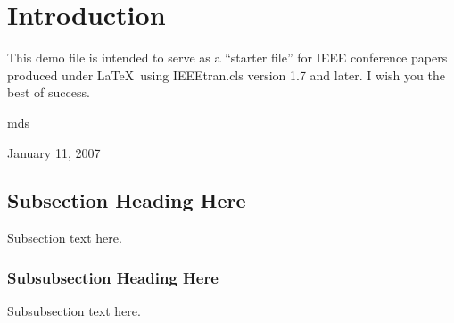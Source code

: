 \documentclass[10pt,conference]{IEEEtran}
\begin{document}




\maketitle


\begin{abstract}
The abstract goes here.
\end{abstract}





%
\IEEEpeerreviewmaketitle



\section{Introduction}
This demo file is intended to serve as a ``starter file''
for IEEE conference papers produced under \LaTeX\ using
IEEEtran.cls version 1.7 and later.
I wish you the best of success.

\hfill mds
 
\hfill January 11, 2007

\subsection{Subsection Heading Here}
Subsection text here.


\subsubsection{Subsubsection Heading Here}
Subsubsection text here.
\end{document}
